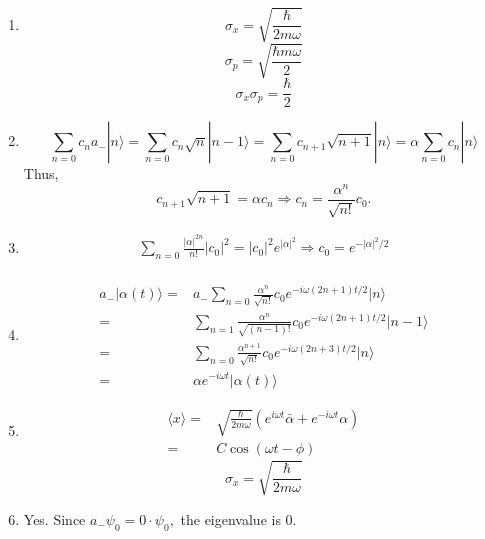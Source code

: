 \begin{enumerate}
\begin{align*}
        -
        \langle\alpha, a_-a_+\alpha\rangle+
        \langle\alpha, a_-^2\alpha\rangle)\\
        =&-\frac{\hbar m\omega}{2}
        (\langle a_-^2\alpha, \alpha\rangle
        -
        \langle a_-\alpha, a_-\alpha\rangle
        -
        \langle\alpha, (1+a_+a_-)\alpha\rangle+
        \langle\alpha, a_-^2\alpha\rangle)\\
        =&
        -\frac{\hbar m\omega}{2}
        (\bar{\alpha}^2-2\bar{\alpha}\alpha - 1 + \alpha^2
        )
    \end{align*}
    \item 
    $$
    \sigma_x= 
    \sqrt{\frac{\hbar}{2m\omega}}
    $$
    $$
    \sigma_p = 
    \sqrt{\frac{\hbar m\omega}{2}}
    $$
    $$
    \sigma_x\sigma_p=\frac{\hbar}{2}
    $$
    \item 
    $$
    \sum_{n=0}c_na_-| n\rangle = 
    \sum_{n=0}c_n\sqrt{n}|n-1\rangle
    =
    \sum_{n=0}c_{n+1}\sqrt{n+1}|n\rangle
    =\alpha\sum_{n=0}c_n| n\rangle
    $$
    Thus, $$c_{n+1}\sqrt{n+1}=\alpha c_n
    \Rightarrow
    c_n = \frac{\alpha^n}{\sqrt{n!}}c_0.
    $$ 
    \item 
    \begin{align*}
        \sum_{n=0}\frac{|\alpha|^{2n}}{n!}|c_0|^2=
        |c_0|^2e^{|\alpha|^2}\Rightarrow c_0=e^{-|\alpha|^2/2}\\
    \end{align*}
    \item 
    \begin{align*}
        a_-|\alpha(t)\rangle =&
        a_-\sum_{n=0} \frac{\alpha^n}{\sqrt{n!}}c_0e^{-i\omega(2n+1)t/2}|n\rangle\\
        =&\sum_{n=1} \frac{\alpha^n}{\sqrt{(n-1)!}}c_0e^{-i\omega(2n+1)t/2}|n-1\rangle
        \\
        =&\sum_{n=0} \frac{\alpha^{n+1}}{\sqrt{n!}}c_0e^{-i\omega(2n+3)t/2}|n\rangle\\
        =&\alpha e^{-i\omega t}|\alpha(t)\rangle
    \end{align*}
    \item 
    \begin{align*}
        \langle x\rangle
        =&\sqrt{\frac{\hbar}{2m\omega}}
        (e^{i\omega t}\bar{\alpha} + e^{-i\omega t}\alpha)\\
        =&C\cos(\omega t-\phi)
    \end{align*}
    $$
    \sigma_x = \sqrt{\frac{\hbar}{2m\omega}}
    $$
    \item 
    Yes. Since $a_-\psi_0=0\cdot\psi_0,$ the eigenvalue is 0.
\end{enumerate}

